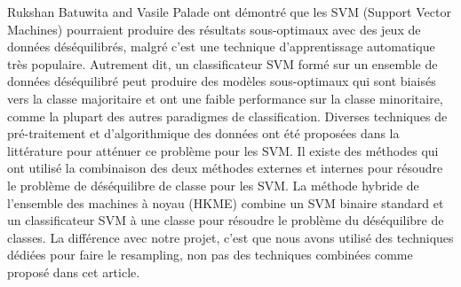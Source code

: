 \documentclass[12pt, french]{report}
\begin{document}
Rukshan Batuwita and Vasile Palade \cite{key32} ont démontré que les SVM (Support Vector Machines) pourraient produire des résultats sous-optimaux avec des jeux de données déséquilibrés, malgré c'est une technique d'apprentissage automatique très populaire. Autrement dit, un classificateur SVM formé sur un ensemble de données déséquilibré peut produire des modèles sous-optimaux qui sont biaisés vers la classe majoritaire et ont une faible performance sur la classe minoritaire, comme la plupart des autres paradigmes de classification. Diverses techniques de pré-traitement et d'algorithmique des données ont été proposées dans la littérature pour atténuer ce problème pour les SVM. Il existe des méthodes qui ont utilisé la combinaison des deux méthodes externes et internes pour résoudre le problème de déséquilibre de classe pour les SVM. La méthode hybride de l'ensemble des machines à noyau (HKME) combine un SVM binaire standard et un classificateur SVM à une classe pour résoudre le problème du déséquilibre de classes. La différence avec notre projet, c'est que nous avons utilisé des techniques dédiées pour faire le resampling, non pas des techniques combinées comme proposé dans cet article.


  
\end{document}
